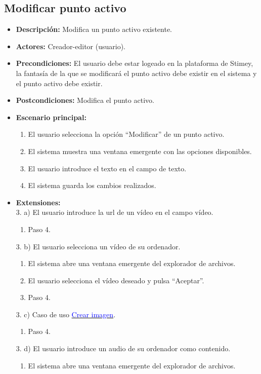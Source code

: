 \documentclass[12pt,letterpaper]{article}
\begin{document}
\subsection{Modificar punto activo}
\begin{itemize}
	\item \textbf{Descripción:} Modifica un punto activo existente.
	\item \textbf{Actores:} Creador-editor (usuario).
	\item \textbf{Precondiciones:} El usuario debe estar logeado en la plataforma de Stimey, la fantasía de la que se modificará el punto activo debe existir en el sistema y el punto activo debe existir.
	\item \textbf{Postcondiciones:} Modifica el punto activo.
	\item \textbf{Escenario principal:}
	\begin{enumerate}
		\item El usuario selecciona la opción ``Modificar'' de un punto activo.
		\item El sistema muestra una ventana emergente con las opciones disponibles.
		\item El usuario introduce el texto en el campo de texto.
		\item El sistema guarda los cambios realizados.
	\end{enumerate}
	\item \textbf{Extensiones:} \\3. a) El usuario introduce la url de un vídeo en el campo vídeo.
	\begin{enumerate}
		\item Paso 4.
	\end{enumerate}
	3. b) El usuario selecciona un vídeo de su ordenador.
	\begin{enumerate}
		\item El sistema abre una ventana emergente del explorador de archivos.
		\item El usuario selecciona el vídeo deseado y pulsa ``Aceptar''.
		\item Paso 4.
	\end{enumerate}
	3. c) Caso de uso \hyperlink{crearimagen}{\textcolor{blue}{Crear imagen}}.
	\begin{enumerate}
		\item Paso 4.
	\end{enumerate}
	3. d) El usuario introduce un audio de su ordenador como contenido.
	\begin{enumerate}
		\item El sistema abre una ventana emergente del explorador de archivos.

\end{enumerate}
\end{itemize}
\end{document}
